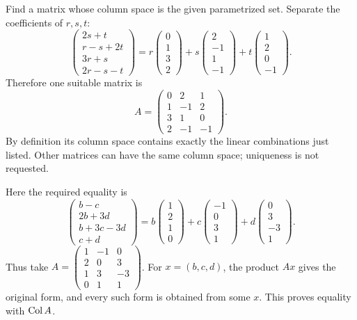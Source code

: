 \goal Find a matrix whose column space is the given parametrized set.
Separate the coefficients of $r,s,t$:
\[
 \begin{pmatrix}2s+t\\r-s+2t\\3r+s\\2r-s-t\end{pmatrix}
 =r\begin{pmatrix}0\\1\\3\\2\end{pmatrix}
 +s\begin{pmatrix}2\\-1\\1\\-1\end{pmatrix}
 +t\begin{pmatrix}1\\2\\0\\-1\end{pmatrix}.
\]
Therefore one suitable matrix is
\[
 A=\begin{pmatrix}0&2&1\\1&-1&2\\3&1&0\\2&-1&-1\end{pmatrix}.
\]
By definition its column space contains exactly the linear combinations just
listed. Other matrices can have the same column space; uniqueness is not requested.

Here the required equality is
\[
 \begin{pmatrix}b-c\\2b+3d\\b+3c-3d\\c+d\end{pmatrix}
 =b\begin{pmatrix}1\\2\\1\\0\end{pmatrix}
 +c\begin{pmatrix}-1\\0\\3\\1\end{pmatrix}
 +d\begin{pmatrix}0\\3\\-3\\1\end{pmatrix}.
\]
Thus take
$A=\left(\begin{smallmatrix}1&-1&0\\2&0&3\\1&3&-3\\0&1&1\end{smallmatrix}\right)$.
For $x=(b,c,d)$, the product $Ax$ gives the original form, and every such
form is obtained from some $x$. This proves equality with $\operatorname{Col} A$.

